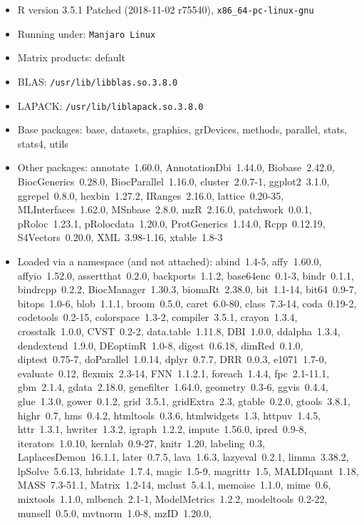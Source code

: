 \documentclass[12pt]{article}\usepackage[]{graphicx}\usepackage[]{color}
\begin{document}
\begin{appendices}
\begin{itemize}\raggedright
  \item R version 3.5.1 Patched (2018-11-02 r75540), \verb|x86_64-pc-linux-gnu|
  \item Running under: \verb|Manjaro Linux|
  \item Matrix products: default
  \item BLAS: \verb|/usr/lib/libblas.so.3.8.0|
  \item LAPACK: \verb|/usr/lib/liblapack.so.3.8.0|
  \item Base packages: base, datasets, graphics, grDevices,
    methods, parallel, stats, stats4, utils
  \item Other packages: annotate~1.60.0, AnnotationDbi~1.44.0,
    Biobase~2.42.0, BiocGenerics~0.28.0, BiocParallel~1.16.0,
    cluster~2.0.7-1, ggplot2~3.1.0, ggrepel~0.8.0, hexbin~1.27.2,
    IRanges~2.16.0, lattice~0.20-35, MLInterfaces~1.62.0,
    MSnbase~2.8.0, mzR~2.16.0, patchwork~0.0.1, pRoloc~1.23.1,
    pRolocdata~1.20.0, ProtGenerics~1.14.0, Rcpp~0.12.19,
    S4Vectors~0.20.0, XML~3.98-1.16, xtable~1.8-3
  \item Loaded via a namespace (and not attached): abind~1.4-5,
    affy~1.60.0, affyio~1.52.0, assertthat~0.2.0, backports~1.1.2,
    base64enc~0.1-3, bindr~0.1.1, bindrcpp~0.2.2,
    BiocManager~1.30.3, biomaRt~2.38.0, bit~1.1-14, bit64~0.9-7,
    bitops~1.0-6, blob~1.1.1, broom~0.5.0, caret~6.0-80,
    class~7.3-14, coda~0.19-2, codetools~0.2-15, colorspace~1.3-2,
    compiler~3.5.1, crayon~1.3.4, crosstalk~1.0.0, CVST~0.2-2,
    data.table~1.11.8, DBI~1.0.0, ddalpha~1.3.4, dendextend~1.9.0,
    DEoptimR~1.0-8, digest~0.6.18, dimRed~0.1.0, diptest~0.75-7,
    doParallel~1.0.14, dplyr~0.7.7, DRR~0.0.3, e1071~1.7-0,
    evaluate~0.12, flexmix~2.3-14, FNN~1.1.2.1, foreach~1.4.4,
    fpc~2.1-11.1, gbm~2.1.4, gdata~2.18.0, genefilter~1.64.0,
    geometry~0.3-6, ggvis~0.4.4, glue~1.3.0, gower~0.1.2,
    grid~3.5.1, gridExtra~2.3, gtable~0.2.0, gtools~3.8.1,
    highr~0.7, hms~0.4.2, htmltools~0.3.6, htmlwidgets~1.3,
    httpuv~1.4.5, httr~1.3.1, hwriter~1.3.2, igraph~1.2.2,
    impute~1.56.0, ipred~0.9-8, iterators~1.0.10, kernlab~0.9-27,
    knitr~1.20, labeling~0.3, LaplacesDemon~16.1.1, later~0.7.5,
    lava~1.6.3, lazyeval~0.2.1, limma~3.38.2, lpSolve~5.6.13,
    lubridate~1.7.4, magic~1.5-9, magrittr~1.5, MALDIquant~1.18,
    MASS~7.3-51.1, Matrix~1.2-14, mclust~5.4.1, memoise~1.1.0,
    mime~0.6, mixtools~1.1.0, mlbench~2.1-1, ModelMetrics~1.2.2,
    modeltools~0.2-22, munsell~0.5.0, mvtnorm~1.0-8, mzID~1.20.0,

\end{itemize}
\end{appendices}
\end{document}
